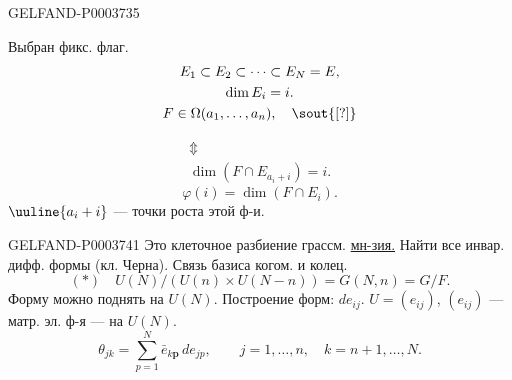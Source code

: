 \begin{GelfandAdjacentEvidence}{GELFAND-P000373}{5}

Выбран фикс. флаг.
\begin{gather*}E_1\subset E_2\subset\dots\subset E_N=E,\\\dim E_i=i.\\
F\in\Omega(a_1,\dots,a_n),\quad\text{\sout{[?]}}\end{gather*}
\end{GelfandAdjacentEvidence}

\begin{gather*}\Updownarrow\\\dim(F\cap E_{a_i+i})=i.\end{gather*}
\begin{equation*}\varphi(i)=\dim(F\cap E_i).\end{equation*}
$\uuline{a_i+i}$ --- точки роста этой ф-и.


\begin{GelfandAdjacentEvidence}{GELFAND-P000374}{1}
Это клеточное разбиение грассм. \underline{мн-зия.}
 Найти все инвар. дифф. формы (кл. Черна).
Связь базиса когом. и колец.
\begin{equation*}(*)\quad U(N)/(U(n)\times U(N-n))=G(N,n)=G/F.\end{equation*}
Форму можно поднять на $U(N)$.
Построение форм:
$de_{ij}$.
$U=(e_{ij})$, $(e_{ij})$ --- матр. эл. ф-я --- на $U(N)$.
\begin{equation*}\theta_{jk}=\sum_{p=1}^N\bar e_{k\boldsymbol p}\,de_{jp},\qquad j=1,\dots,n,\quad k=n+1,\dots,N.\end{equation*}
\end{GelfandAdjacentEvidence}




